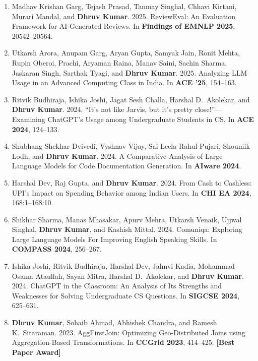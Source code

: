 \documentclass[10pt, a4paper]{article}
\newcommand{\award}[1]{%
  {\small\bfseries\color{AwardRed}[#1]}%
}
\begin{document}
\begin{enumerate}[label=\textbf{C\arabic*.}, leftmargin=2.8em, itemsep=0.3em]
\item Madhav Krishan Garg, Tejash Prasad, Tanmay Singhal, Chhavi Kirtani, Murari Mandal, and \textbf{Dhruv Kumar}. 2025. ReviewEval: An Evaluation Framework for AI-Generated Reviews. In \textbf{Findings of EMNLP 2025}, 20542--20564.

\item Utkarsh Arora, Anupam Garg, Aryan Gupta, Samyak Jain, Ronit Mehta, Rupin Oberoi, Prachi, Aryaman Raina, Manav Saini, Sachin Sharma, Jaskaran Singh, Sarthak Tyagi, and \textbf{Dhruv Kumar}. 2025. Analyzing LLM Usage in an Advanced Computing Class in India. In \textbf{ACE '25}, 154--163.

\item Ritvik Budhiraja, Ishika Joshi, Jagat Sesh Challa, Harshal D.\ Akolekar, and \textbf{Dhruv Kumar}. 2024. ``It's not like Jarvis, but it's pretty close!''---Examining ChatGPT's Usage among Undergraduate Students in CS. In \textbf{ACE 2024}, 124--133.

\item Shubhang Shekhar Dvivedi, Vyshnav Vijay, Sai Leela Rahul Pujari, Shoumik Lodh, and \textbf{Dhruv Kumar}. 2024. A Comparative Analysis of Large Language Models for Code Documentation Generation. In \textbf{AIware 2024}.

\item Harshal Dev, Raj Gupta, and \textbf{Dhruv Kumar}. 2024. From Cash to Cashless: UPI's Impact on Spending Behavior among Indian Users. In \textbf{CHI EA 2024}, 168:1--168:10.

\item Shikhar Sharma, Manas Mhasakar, Apurv Mehra, Utkarsh Venaik, Ujjwal Singhal, \textbf{Dhruv Kumar}, and Kashish Mittal. 2024. Comuniqa: Exploring Large Language Models For Improving English Speaking Skills. In \textbf{COMPASS 2024}, 256--267.

\item Ishika Joshi, Ritvik Budhiraja, Harshal Dev, Jahnvi Kadia, Mohammad Osama Ataullah, Sayan Mitra, Harshal D.\ Akolekar, and \textbf{Dhruv Kumar}. 2024. ChatGPT in the Classroom: An Analysis of Its Strengths and Weaknesses for Solving Undergraduate CS Questions. In \textbf{SIGCSE 2024}, 625--631.

\item \textbf{Dhruv Kumar}, Sohaib Ahmad, Abhishek Chandra, and Ramesh K.\ Sitaraman. 2023. AggFirstJoin: Optimizing Geo-Distributed Joins using Aggregation-Based Transformations. In \textbf{CCGrid 2023}, 414--425. \award{Best Paper Award}


\end{enumerate}
\end{document}
